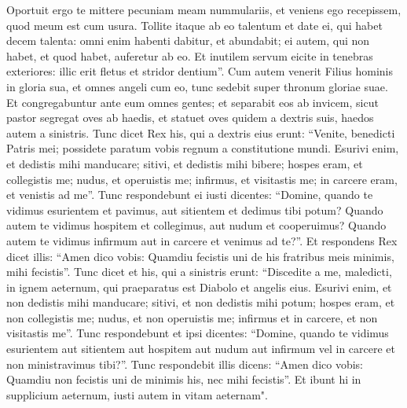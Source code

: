\begin{biblechapter}
\verse Oportuit ergo te mittere pecuniam meam nummulariis, et veniens ego recepissem, quod meum est cum usura. 
\verse Tollite itaque ab eo talentum et date ei, qui habet decem talenta: 
\verse omni enim habenti dabitur, et abundabit; ei autem, qui non habet, et quod habet, auferetur ab eo. 
\verse Et inutilem servum eicite in tenebras exteriores: illic erit fletus et stridor dentium”. 
\verse Cum autem venerit Filius hominis in gloria sua, et omnes angeli cum eo, tunc sedebit super thronum gloriae suae. 
\verse Et congregabuntur ante eum omnes gentes; et separabit eos ab invicem, sicut pastor segregat oves ab haedis,  
\verse et statuet oves quidem a dextris suis, haedos autem a sinistris. 
\verse Tunc dicet Rex his, qui a dextris eius erunt: “Venite, benedicti Patris mei; possidete paratum vobis regnum a constitutione mundi. 
\verse Esurivi enim, et dedistis mihi manducare; sitivi, et dedistis mihi bibere; hospes eram, et collegistis me; 
\verse nudus, et operuistis me; infirmus, et visitastis me; in carcere eram, et venistis ad me”. 
\verse Tunc respondebunt ei iusti dicentes: “Domine, quando te vidimus esurientem et pavimus, aut sitientem et dedimus tibi potum? 
\verse Quando autem te vidimus hospitem et collegimus, aut nudum et cooperuimus? 
\verse Quando autem te vidimus infirmum aut in carcere et venimus ad te?”. 
\verse Et respondens Rex dicet illis: “Amen dico vobis: Quamdiu fecistis uni de his fratribus meis minimis, mihi fecistis”. 
\verse Tunc dicet et his, qui a sinistris erunt: “Discedite a me, maledicti, in ignem aeternum, qui praeparatus est Diabolo et angelis eius. 
\verse Esurivi enim, et non dedistis mihi manducare; sitivi, et non dedistis mihi potum; 
\verse hospes eram, et non collegistis me; nudus, et non operuistis me; infirmus et in carcere, et non visitastis me”. 
\verse Tunc respondebunt et ipsi dicentes: “Domine, quando te vidimus esurientem aut sitientem aut hospitem aut nudum aut infirmum vel in carcere et non ministravimus tibi?”. 
\verse Tunc respondebit illis dicens: “Amen dico vobis: Quamdiu non fecistis uni de minimis his, nec mihi fecistis”. 
\verse Et ibunt hi in supplicium aeternum, iusti autem in vitam aeternam". 
\end{biblechapter}

